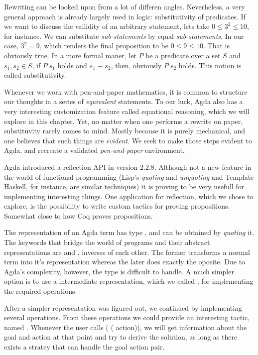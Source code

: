 Rewriting can be looked upon from a lot of differen angles. Neverheless, a very general approach
is already largely used in logic: substitutivity of predicates. If we want to discuss
the vailidity of an arbitrary statement, lets take $0 \leq 3^2 \leq 10$, for instance. We can
substitute \emph{sub-statements} by equal \emph{sub-statements}. In our case, $3^2 = 9$,
which renders the final proposition to be $0 \leq 9 \leq 10$. That is obviously true.
In a more formal maner, let $P$ be a predicate
over a set $S$ and $s_1, s_2 \in S$, if $P\;s_1$ holds and $s_1 \equiv s_2$, then, obviously
$P\;s_2$ holds. This notion is called substitutivity.

Whenever we work with pen-and-paper mathematics, it is common to structure our thoughts
in a series of \emph{equivalent} statements. To our luck, Agda also has a very interesting
customization feature called equational reasoning, which we will explore in this chapter.
Yet, no matter when one performs a rewrite on paper, substituvity rarely comes to mind.
Mostly because it is purely mechanical, and one believes that such things are \emph{evident}.
We seek to make those steps evident to Agda, and recreate a validated \emph{pen-and-paper}
environment.

Agda introduced a reflection API in version 2.2.8. Although not a new feature
in the world of functional programming (Lisp's \emph{quoting} and \emph{unquoting} 
and Template Haskell, for instance, are similar techniques) 
it is proving to be very usefull for implementing interesting things. 
One application for reflection, which we chose to explore, is 
the possibility to write custom tactics for proving propositions. 
Somewhat close to how Coq proves propositions.

The representation of an Agda term has type , and can be obtained
by \emph{quoting} it.
The keywords that bridge the world of programs and their abstract representations 
are  and , inverses of each other. 
The former transforms a normal term into it's  representation whereas the 
later does exactly the oposite. Due to Agda's complexity, however, the type  is difficult
to handle. A much simpler option is to use a intermediate representation, which we called ,
for implementing the required operations.

After a simpler representation was figured out, we continued by implementing several
 operations. From these operations we could provide an interesting tactic,
named . Whenever the user calls ( ( action)), we will get information
about the goal and action at that point and try to derive the solution, as long as there exists
a stratey that can handle the goal action pair.


